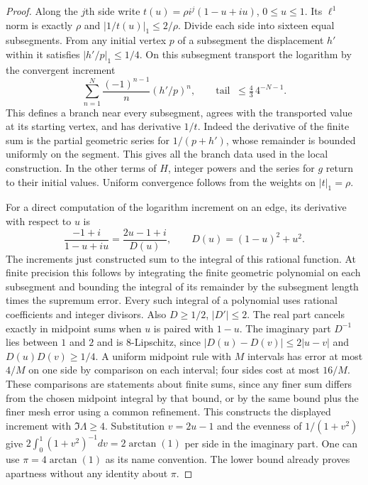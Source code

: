 \begin{proof}
Along the $j$th side write $t(u)=\rho i^j(1-u+iu)$, $0\le u\le1$. Its $\ell^1$ norm is exactly $\rho$ and $|1/t(u)|_1\le2/\rho$. Divide each side into sixteen equal subsegments. From any initial vertex $p$ of a subsegment the displacement $h'$ within it satisfies $|h'/p|_1\le1/4$. On this subsegment transport the logarithm by the convergent increment
\[
 \sum_{n=1}^{N}\frac{(-1)^{n-1}}{n}(h'/p)^n,\qquad
 \text{tail }\ \le \tfrac43\,4^{-N-1}.
\]
This defines a branch near every subsegment, agrees with the transported value at its starting vertex, and has derivative $1/t$. Indeed the derivative of the finite sum is the partial geometric series for $1/(p+h')$, whose remainder is bounded uniformly on the segment. This gives all the branch data used in the local construction. In the other terms of $H$, integer powers and the series for $g$ return to their initial values. Uniform convergence follows from the weights on $|t|_1=\rho$.

For a direct computation of the logarithm increment on an edge, its derivative with respect to $u$ is
\[
 \frac{-1+i}{1-u+iu}=\frac{2u-1+i}{D(u)},\qquad
 D(u)=(1-u)^2+u^2 .
\]
The increments just constructed sum to the integral of this rational function. At finite precision this follows by integrating the finite geometric polynomial on each subsegment and bounding the integral of its remainder by the subsegment length times the supremum error. Every such integral of a polynomial uses rational coefficients and integer divisors. Also $D\ge 1/2$, $|D'|\le2$. The real part cancels exactly in midpoint sums when $u$ is paired with $1-u$. The imaginary part $D^{-1}$ lies between $1$ and $2$ and is $8$-Lipschitz, since
$|D(u)-D(v)|\le2|u-v|$ and $D(u)D(v)\ge1/4$.
A uniform midpoint rule with $M$ intervals has error at most $4/M$ on one side by comparison on each interval; four sides cost at most $16/M$. These comparisons are statements about finite sums, since any finer sum differs from the chosen midpoint integral by that bound, or by the same bound plus the finer mesh error using a common refinement. This constructs the displayed increment with $\Im\Lambda\ge4$. Substitution $v=2u-1$ and the evenness of $1/(1+v^2)$ give $2\int_0^1(1+v^2)^{-1}dv=2\arctan(1)$ per side in the imaginary part. One can use $\pi=4\arctan(1)$ as its name convention. The lower bound already proves apartness without any identity about $\pi$.


\end{proof}
